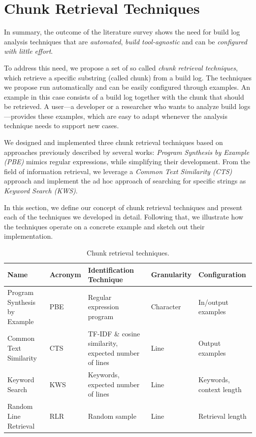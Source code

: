 \section{Chunk Retrieval Techniques}
\label{sec:techniques}

In summary, the outcome of the literature survey shows the need for
build log
analysis techniques that are \emph{automated},
\emph{build tool-agnostic}
and can be \emph{configured with little effort}.

To address this need,
we propose a set of so called \emph{chunk retrieval techniques},
which retrieve a specific substring (called chunk)
from a build log.
The techniques we propose run automatically
and can be easily configured through examples.
An example in this case consists of a build log together with the
chunk that should be retrieved.
A user---a developer or a researcher who wants to analyze
build logs---provides these examples, which are easy to
adapt whenever the analysis technique needs
to support new cases.

We designed and implemented three chunk retrieval
techniques based on approaches
previously described by several works:
\emph{Program Synthesis by Example (PBE)}
mimics regular expressions, while simplifying
their development.
From the field of information retrieval, we leverage a
\emph{Common Text Similarity (CTS)} approach
and implement the ad hoc approach of
searching for specific strings as \emph{Keyword Search (KWS)}.

In this section, we define our concept of chunk
retrieval techniques and present each of the techniques
we developed in detail.
Following that, we illustrate how the techniques
operate on a concrete
example and sketch out their implementation.

\begin{table}[htb]
\centering
\caption{Chunk retrieval techniques.}
\begin{tabularx}{\textwidth}{@{}llXll@{}}
\toprule
Name			     & Acronym & Identification Technique
& Granularity & Configuration \\
\midrule
Program Synthesis by Example & PBE     & Regular expression program
& Character   & In/output examples	\\
Common Text Similarity	     & CTS     & TF-IDF \& cosine similarity,
expected number of lines & Line        & Output examples	   \\
Keyword Search		     & KWS     & Keywords, expected number of
lines			 & Line        & Keywords, context length  \\
Random Line Retrieval	     & RLR     & Random sample
& Line	      & Retrieval length	  \\
\bottomrule
\end{tabularx}
\label{tab:techniques}
\end{table}

